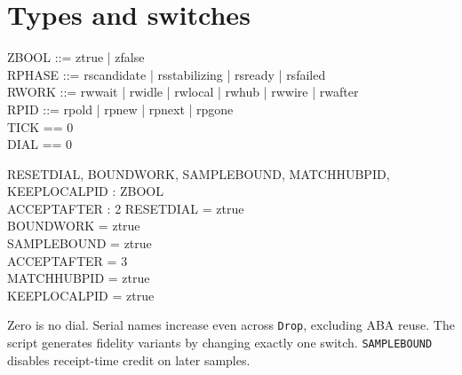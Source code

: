 \documentclass[a4paper,10pt,fleqn]{article}
\begin{document}
\section{Types and switches}
\begin{zed}
  ZBOOL ::= ztrue | zfalse \\
  RPHASE ::= rscandidate | rsstabilizing | rsready | rsfailed \\
  RWORK ::= rwwait | rwidle | rwlocal | rwhub | rwwire | rwafter \\
  RPID ::= rpold | rpnew | rpnext | rpgone \\
  TICK == 0  \\
  DIAL == 0 
\end{zed}
\begin{axdef}
  RESETDIAL, BOUNDWORK, SAMPLEBOUND, MATCHHUBPID, KEEPLOCALPID : ZBOOL \\
  ACCEPTAFTER : 2 
\where
  RESETDIAL = ztrue \\
  BOUNDWORK = ztrue \\
  SAMPLEBOUND = ztrue \\
  ACCEPTAFTER = 3 \\
  MATCHHUBPID = ztrue \\
  KEEPLOCALPID = ztrue
\end{axdef}
Zero is no dial. Serial names increase even across \texttt{Drop}, excluding ABA
reuse. The script generates fidelity variants by changing exactly one switch.
\texttt{SAMPLEBOUND} disables receipt-time credit on later samples.
\end{document}
